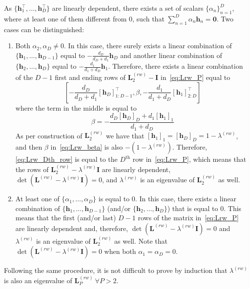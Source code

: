 \documentclass[a4paper,12pt,openany]{book}
\newcommand{\I}{\mathbf{I}}
\renewcommand{\L}{\mathbf{L}}
\newcommand{\h}{\mathbf{h}}
\begin{document}
\begin{appendices}
As $\{\h_1^\top, \ldots, \h_D^\top\}$ are linearly dependent, there exists a set of scalars $\{\alpha_n\}_{n=1}^D$, where at least one of them different from 0, such that $\sum_{n=1}^D \alpha_n\h_n=\mathbf{0}$. Two cases can be distinguished:
\begin{enumerate}
	\item Both $\alpha_2,\alpha_D\neq0$. In this case, there surely exists a linear combination of $\{\h_1,\ldots,\h_{D-1}\}$ equal to $-\frac{d_D}{d_D+d_1}\h_D$ and another linear combination of $\{\h_2,\ldots,\h_D\}$ equal to $-\frac{d_1}{d_1+d_D}\h_1$. Therefore, there exists a linear combination of the $D - 1$ first and ending rows of $\L_2^{(rw)}-\I$ in~\eqref{eq:Lrw_P} equal to
	\begin{equation}\label{eq:Lrw_Dth_row}
		\left[-\frac{d_D}{d_D+d_1}[\h_D]_{1:D-1}^\top, \beta, -\frac{d_1}{d_1+d_D}[\h_1]_{2:D}^\top\right]
	\end{equation}
	where the term in the middle is equal to
	\begin{equation}\label{eq:Lrw_beta}
		\beta = -\frac{d_D[\h_D]_D + d_1[\h_1]_1}{d_1+d_D}
	\end{equation}
	As per construction of $\L_2^{(rw)}$ we have that $[\h_1]_1=[\h_D]_D=1-\lambda^{(rw)}$, and then $\beta$ in~\eqref{eq:Lrw_beta} is also $-(1-\lambda^{(rw)})$. Therefore, \eqref{eq:Lrw_Dth_row} is equal to the $D^\text{th}$ row in~\eqref{eq:Lrw_P}, which means that the rows of $\L_2^{(rw)}-\lambda^{(rw)}\I$ are linearly dependent, $\det(\L^{(rw)}-\lambda^{(rw)}\I)=0$, and $\lambda^{(rw)}$ is an eigenvalue of $\L_2^{(rw)}$ as well.
	\item At least one of $\{\alpha_1,\ldots,\alpha_D\}$ is equal to 0. In this case, there exists a linear combination of $\{\h_1,\ldots, \h_{D-1}\}$ (and/or $\{\h_2,\ldots, \h_D\}$) that is equal to 0. This means that the
	first (and/or last) $D-1$ rows of the matrix in~\eqref{eq:Lrw_P} are linearly dependent and, therefore, $\det(\L^{(rw)}-\lambda^{(rw)}\I)=0$ and $\lambda^{(rw)}$ is an eigenvalue of $\L_2^{(rw)}$ as well. Note that $\det(\L^{(rw)}-\lambda^{(rw)}\I)=0$ when both $\alpha_1=\alpha_D=0$.
\end{enumerate}
Following the same procedure, it is not difficult to prove by induction that $\lambda^{(rw)}$ is also an eigenvalue of $\L_P^{(rw)}\ \forall P>2$.


\end{appendices}
\end{document}
